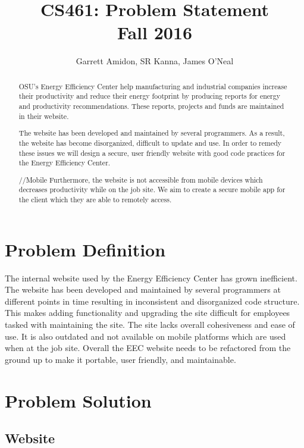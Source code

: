 \documentclass[letterpaper,10pt,titlepage,draftclsnofoot,onecolumn]{IEEEtran}
\title{CS461: Problem Statement \\
	\large Fall 2016}
\author{Garrett Amidon, SR Kanna, James O'Neal}
\begin{document}
\begin{titlingpage}
    \maketitle
	\centering{}
    \begin{abstract}
        OSU’s Energy Efficiency Center help manufacturing and industrial companies increase their productivity and reduce their energy footprint by producing reports for energy and productivity recommendations. These reports, projects and funds are maintained in their website.\newline

		The website has been developed and maintained by several programmers. As a result, the website has become disorganized, difficult to update and use. In order to remedy these issues we will design a secure, user friendly website with good code practices for the Energy Efficiency Center.\newline

		//Mobile \newline
		Furthermore, the website is not accessible from mobile devices which decreases productivity while on the job site. We aim to create a secure mobile app for the client which they are able to remotely access.
    \end{abstract}
\end{titlingpage}
\section{Problem Definition}

The internal website used by the Energy Efficiency Center has grown inefficient. The website has been developed and maintained by several programmers at different points in time resulting in inconsistent and disorganized code structure. This makes adding functionality and upgrading the site difficult for employees tasked with maintaining the site. The site lacks overall cohesiveness and ease of use. It  is also outdated and not available on mobile platforms which are used when at the job site. Overall the EEC website needs to be refactored from the ground up to make it portable, user friendly, and maintainable. 

\section{Problem Solution}

\subsection{Website}
\end{document}
